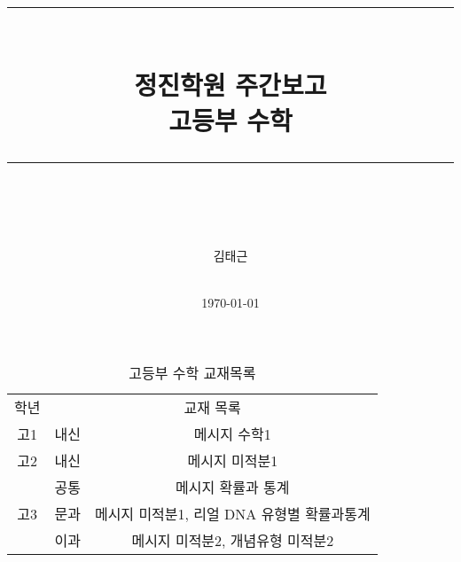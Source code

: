 \documentclass[idxtotoc,hyperref,openany]{labbook} %
\newcommand{\HRule}{\rule{\linewidth}{0.5mm}} %
\begin{document}

\frontmatter %
\title{
\begin{center}
\HRule \\[0.4cm]
{\Huge \bfseries 정진학원 주간보고  \\[0.5cm] \Large 고등부 수학}\\[0.4cm] %
\HRule \\[1.5cm]
\end{center}
}
\author{\LARGE 김태근 \\  \\[2cm]} %
\date{\today} %
\maketitle

\tableofcontents

\mainmatter %












\begin{table}[h]
\centering
\begin{adjustbox}{width=\textwidth}
\begin{tabular}{c||c|c}
\toprule
\midrule
학년 & \multicolumn{2}{c}{교재 목록} \\
\hhline{=||==}
고1 & 내신 & 메시지 수학1 \\
\hline
고2 & 내신 & 메시지 미적분1\\
\hline
\multirow{3}{*}{고3} & 공통 & 메시지 확률과 통계 \\ \hhline{~--}
					& 문과 & 메시지 미적분1, 리얼 DNA 유형별 확률과통계\\ \hhline{~--}
					& 이과 & 메시지 미적분2, 개념유형 미적분2\\

\hline
\end{tabular}
\end{adjustbox}
\caption{\label{tab:i} 고등부 수학 교재목록 }
\end{table}
\end{document}
